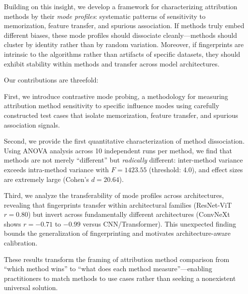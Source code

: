 Building on this insight, we develop a framework for characterizing attribution methods by their \emph{mode profiles}: systematic patterns of sensitivity to memorization, feature transfer, and spurious association. If methods truly embed different biases, these mode profiles should dissociate cleanly---methods should cluster by identity rather than by random variation. Moreover, if fingerprints are intrinsic to the algorithms rather than artifacts of specific datasets, they should exhibit stability within methods and transfer across model architectures.

Our contributions are threefold:

First, we introduce contrastive mode probing, a methodology for measuring attribution method sensitivity to specific influence modes using carefully constructed test cases that isolate memorization, feature transfer, and spurious association signals.

Second, we provide the first quantitative characterization of method dissociation. Using ANOVA analysis across 10 independent runs per method, we find that methods are not merely ``different'' but \emph{radically} different: inter-method variance exceeds intra-method variance with $F=1423.55$ (threshold: 4.0), and effect sizes are extremely large (Cohen's $d=20.64$).

Third, we analyze the transferability of mode profiles across architectures, revealing that fingerprints transfer within architectural families (ResNet-ViT $r=0.80$) but invert across fundamentally different architectures (ConvNeXt shows $r=-0.71$ to $-0.99$ versus CNN/Transformer). This unexpected finding bounds the generalization of fingerprinting and motivates architecture-aware calibration.

These results transform the framing of attribution method comparison from ``which method wins'' to ``what does each method measure''---enabling practitioners to match methods to use cases rather than seeking a nonexistent universal solution.
